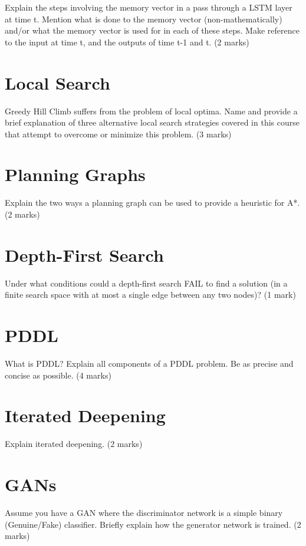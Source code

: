 \documentclass{article}
\begin{document}
Explain the steps involving the memory vector in a pass through a LSTM layer at time t. Mention what is done to the memory vector (non-mathematically) and/or what the memory vector is used for in each of these steps. Make reference to the input at time t, and the outputs of time t-1 and t. (2 marks)\clearpage
\section{ Local Search }

Greedy Hill Climb suffers from the problem of local optima. Name and provide a brief explanation of three alternative local search strategies covered in this course that attempt to overcome or minimize this problem. (3 marks)
\clearpage
\section{ Planning Graphs }

Explain the two ways a planning graph can be used to provide a heuristic for A*. (2 marks)
\clearpage
\section{ Depth-First Search }

Under what conditions could a depth-first search FAIL to find a solution (in a finite search space with at most a single edge between any two nodes)? (1 mark)\clearpage
\section{ PDDL }

What is PDDL? Explain all components of a PDDL problem. Be as precise and concise as possible.  (4 marks)
\clearpage
\section{ Iterated Deepening }

Explain iterated deepening. (2 marks)
\clearpage
\section{ GANs }

Assume you have a GAN where the discriminator network is a simple binary (Genuine/Fake) classifier. Briefly explain how the generator network is trained. (2 marks)
\end{document}
